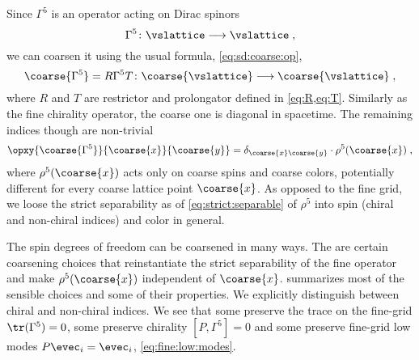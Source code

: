 Since $\Gamma^5$ is an operator acting on Dirac spinors
\begin{equation}
\Gamma^5 \colon \vslattice \longrightarrow \vslattice \;,
\end{equation}
we can coarsen it using the usual formula, \cref{eq:sd:coarse:op},
\begin{equation}
\coarse{\Gamma^5} = R \Gamma^5 T \colon \coarse{\vslattice} \longrightarrow \coarse{\vslattice} \;,
\end{equation}
where $R$ and $T$ are restrictor and prolongator defined in \cref{eq:R,eq:T}.
Similarly as the fine chirality operator, the coarse one is diagonal in spacetime.
The remaining indices though are non-trivial
\begin{equation}
\opxy{\coarse{\Gamma^5}}{\coarse{x}}{\coarse{y}} = \delta_{\coarse{x} \coarse{y}} \cdot \rho^5(\coarse{x}) \;,
\end{equation}
where $\rho^{5}(\coarse{x})$ acts only on coarse spins and coarse colors, potentially different for every coarse lattice point $\coarse{x}$.
As opposed to the fine grid, we loose the strict separability as of \cref{eq:strict:separable} of $\rho^5$ into spin (chiral and non-chiral indices) and color in general.

The spin degrees of freedom can be coarsened in many ways.
The are certain coarsening choices that reinstantiate the strict separability of the fine operator and make $\rho^5(\coarse{x})$ independent of $\coarse{x}$.
 summarizes most of the sensible choices and some of their properties.
We explicitly distinguish between chiral and non-chiral indices.
We see that some preserve the trace on the fine-grid $\tr(\Gamma^{5})=0$, some preserve chirality $[P, \Gamma^{5}] = 0$ and some preserve fine-grid low modes $P \evec_i = \evec_i$, \cref{eq:fine:low:modes}.

